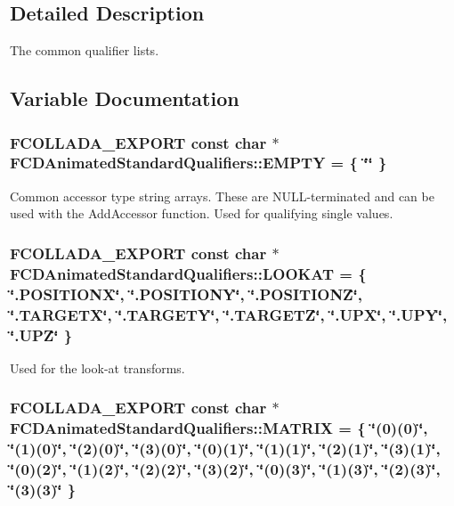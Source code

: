 \subsection{Detailed Description}
The common qualifier lists. 

\subsection{Variable Documentation}
\hypertarget{namespaceFCDAnimatedStandardQualifiers_ab358332d229e064dcf23d78f790f5d8d}{
\subsubsection[{EMPTY}]{\setlength{\rightskip}{0pt plus 5cm}FCOLLADA\_\-EXPORT const char $\ast$ {\bf FCDAnimatedStandardQualifiers::EMPTY} = \{ \char`\"{}\char`\"{} \}}}
\label{namespaceFCDAnimatedStandardQualifiers_ab358332d229e064dcf23d78f790f5d8d}
Common accessor type string arrays. These are NULL-\/terminated and can be used with the AddAccessor function. Used for qualifying single values. \hypertarget{namespaceFCDAnimatedStandardQualifiers_a7f1f279f434275d7e9ddcb4dc4bb9822}{
\subsubsection[{LOOKAT}]{\setlength{\rightskip}{0pt plus 5cm}FCOLLADA\_\-EXPORT const char $\ast$ {\bf FCDAnimatedStandardQualifiers::LOOKAT} = \{ \char`\"{}.POSITIONX\char`\"{}, \char`\"{}.POSITIONY\char`\"{}, \char`\"{}.POSITIONZ\char`\"{}, \char`\"{}.TARGETX\char`\"{}, \char`\"{}.TARGETY\char`\"{}, \char`\"{}.TARGETZ\char`\"{}, \char`\"{}.UPX\char`\"{}, \char`\"{}.UPY\char`\"{}, \char`\"{}.UPZ\char`\"{} \}}}
\label{namespaceFCDAnimatedStandardQualifiers_a7f1f279f434275d7e9ddcb4dc4bb9822}
Used for the look-\/at transforms. \hypertarget{namespaceFCDAnimatedStandardQualifiers_a326b2afcd7eb67b2cb9b9b7c255ecd7f}{
\subsubsection[{MATRIX}]{\setlength{\rightskip}{0pt plus 5cm}FCOLLADA\_\-EXPORT const char $\ast$ {\bf FCDAnimatedStandardQualifiers::MATRIX} = \{ \char`\"{}(0)(0)\char`\"{}, \char`\"{}(1)(0)\char`\"{}, \char`\"{}(2)(0)\char`\"{}, \char`\"{}(3)(0)\char`\"{}, \char`\"{}(0)(1)\char`\"{}, \char`\"{}(1)(1)\char`\"{}, \char`\"{}(2)(1)\char`\"{}, \char`\"{}(3)(1)\char`\"{}, \char`\"{}(0)(2)\char`\"{}, \char`\"{}(1)(2)\char`\"{}, \char`\"{}(2)(2)\char`\"{}, \char`\"{}(3)(2)\char`\"{}, \char`\"{}(0)(3)\char`\"{}, \char`\"{}(1)(3)\char`\"{}, \char`\"{}(2)(3)\char`\"{}, \char`\"{}(3)(3)\char`\"{} \}}}

